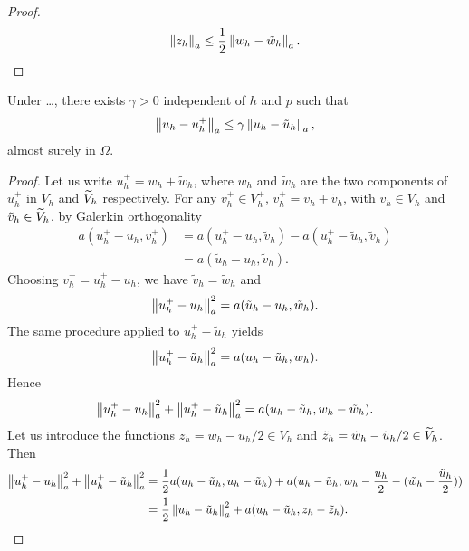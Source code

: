 \documentclass[10pt]{article}
\begin{document}
\begin{proof} 
	\begin{equation}
		\left\|z_h\right\|_a \leq \frac12 \left\|w_h - \tilde w_h\right\|_a.
	\end{equation}
\end{proof}

\begin{lemma} Under \ldots, there exists $\gamma > 0$ independent of $h$ and $p$ such that
	\begin{equation}
		\left\|u_h - u_h^+\right\|_a \leq \gamma \left\|u_h - \tilde u_h\right\|_a,
	\end{equation}
	almost surely in $\Omega$.
\end{lemma}
\begin{proof} Let us write $u_h^+ = w_h + \tilde w_h$, where $w_h$ and $\tilde w_h$ are the two components of $u^+_h$ in $V_h$ and $\widetilde V_h$ respectively. For any $v_h^+ \in V_h^+$, $v_h^+ = v_h + \tilde v_h$, with $v_h \in V_h$ and $\tilde v_h \in \widetilde V_h$, by Galerkin orthogonality 
	\begin{equation}
	\begin{aligned}
		a(u_h^+ - u_h, v_h^+) &= a(u_h^+ - u_h, \tilde v_h) - a(u_h^+ - \tilde u_h, \tilde v_h) \\
		&= a(\tilde u_h - u_h, \tilde v_h).
	\end{aligned}
	\end{equation}
	Choosing $v_h^+ = u_h^+ - u_h$, we have $\tilde v_h = \tilde w_h$ and 
	\begin{equation}
		\left\|u_h^+ - u_h\right\|_a^2 = a(\tilde u_h - u_h, \tilde w_h).
	\end{equation}
	The same procedure applied to $u_h^+ - \tilde u_h$ yields
	\begin{equation}
		\left\|u_h^+ - \tilde u_h\right\|_a^2 = a(u_h - \tilde u_h, w_h).
	\end{equation}
	Hence
	\begin{equation}
		\left\|u_h^+ - u_h\right\|_a^2 + \left\|u_h^+ - \tilde u_h\right\|_a^2 = a(u_h - \tilde u_h, w_h - \tilde w_h).
	\end{equation}
	Let us introduce the functions $z_h = w_h - u_h/2 \in V_h$ and $\tilde z_h = \tilde w_h - \tilde u_h /2 \in \widetilde V_h$. Then
	\begin{equation}
	\begin{aligned}
		\normm{u_h^+ - u_h}^2 + \normm{u_h^+ - \tilde u_h}^2 &= \frac12 a(u_h - \tilde u_h, u_h - \tilde u_h) + a(u_h - \tilde u_h, w_h - \frac{u_h}{2} - (\tilde w_h - \frac{\tilde u_h}{2}))\\
		&= \frac{1}{2} \normm{u_h - \tilde u_h}^2 + a(u_h - \tilde u_h, z_h - \tilde z_h).

\end{aligned}
\end{equation}
\end{proof}
\end{document}
